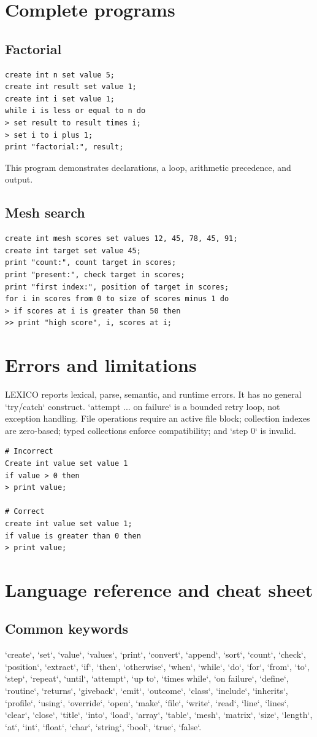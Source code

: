 \documentclass[10.5pt,a4paper]{article}
\begin{document}
\section{Complete programs}
\subsection{Factorial}
\begin{lstlisting}
create int n set value 5;
create int result set value 1;
create int i set value 1;
while i is less or equal to n do
> set result to result times i;
> set i to i plus 1;
print "factorial:", result;
\end{lstlisting}
This program demonstrates declarations, a loop, arithmetic precedence, and output.
\subsection{Mesh search}
\begin{lstlisting}
create int mesh scores set values 12, 45, 78, 45, 91;
create int target set value 45;
print "count:", count target in scores;
print "present:", check target in scores;
print "first index:", position of target in scores;
for i in scores from 0 to size of scores minus 1 do
> if scores at i is greater than 50 then
>> print "high score", i, scores at i;
\end{lstlisting}
\section{Errors and limitations}
LEXICO reports lexical, parse, semantic, and runtime errors. It has no general `try/catch` construct. `attempt ... on failure` is a bounded retry loop, not exception handling. File operations require an active file block; collection indexes are zero-based; typed collections enforce compatibility; and `step 0` is invalid.
\begin{lstlisting}
# Incorrect
Create int value set value 1
if value > 0 then
> print value;

# Correct
create int value set value 1;
if value is greater than 0 then
> print value;
\end{lstlisting}
\section{Language reference and cheat sheet}
\subsection{Common keywords}
`create`, `set`, `value`, `values`, `print`, `convert`, `append`, `sort`, `count`, `check`, `position`, `extract`, `if`, `then`, `otherwise`, `when`, `while`, `do`, `for`, `from`, `to`, `step`, `repeat`, `until`, `attempt`, `up to`, `times while`, `on failure`, `define`, `routine`, `returns`, `giveback`, `emit`, `outcome`, `class`, `include`, `inherits`, `profile`, `using`, `override`, `open`, `make`, `file`, `write`, `read`, `line`, `lines`, `clear`, `close`, `title`, `into`, `load`, `array`, `table`, `mesh`, `matrix`, `size`, `length`, `at`, `int`, `float`, `char`, `string`, `bool`, `true`, `false`.
\end{document}
